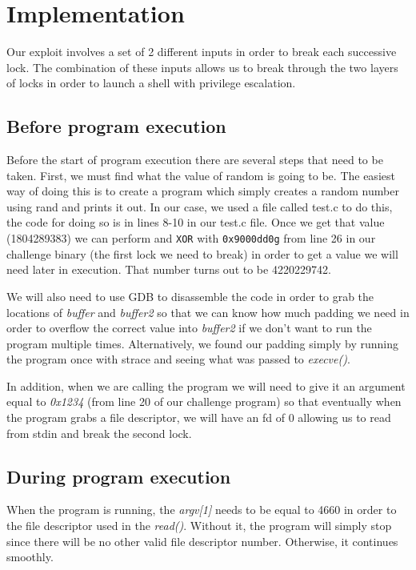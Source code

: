 \section{Implementation}
\label{sec:implementation}
Our exploit involves a set of 2 different inputs in order to break each successive lock. The combination of these inputs allows us to break through the two layers of locks in order to launch a shell with privilege escalation. 

\subsection{Before program execution}
Before the start of program execution there are several steps that need to be taken. First, we must find what the value of random is going to be. The easiest way of doing this is to create a program which simply creates a random number using rand and prints it out. In our case, we used a file called test.c to do this, the code for doing so is in lines 8-10 in our test.c file. Once we get that value (1804289383) we can perform and {\tt XOR} with {\tt 0x9000dd0g} from line 26 in our challenge binary (the first lock we need to break) in order to get a value we will need later in execution. That number turns out to be 4220229742.

We will also need to use GDB to disassemble the code in order to grab the locations of \emph{buffer} and \emph{buffer2} so that we can know how much padding we need in order to overflow the correct value into \emph{buffer2} if we don't want to run the program multiple times. Alternatively, we found our padding simply by running the program once with strace and seeing what was passed to \emph{execve()}. 

In addition, when we are calling the program we will need to give it an argument equal to \emph{0x1234} (from line 20 of our challenge program) so that eventually when the program grabs a file descriptor, we will have an fd of 0 allowing us to read from stdin and break the second lock.

\subsection{During program execution}
When the program is running, the \emph{argv[1]} needs to be equal to 4660 in order to the file descriptor used in the \emph{read()}. Without it, the program will simply stop since there will be no other valid file descriptor number. Otherwise, it continues smoothly.

